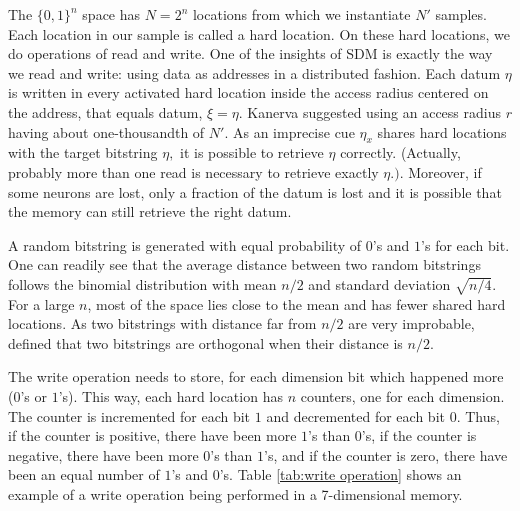 The $\{0,1\}^{n}$ space has $N=2^{n}$ locations from which we instantiate $N'$ samples. Each location in our sample is called a hard location.  On these hard locations, we do operations of read and write. One of the insights of SDM is exactly the way we read and write: using data as addresses in a distributed fashion. Each datum $\eta$ is written in every activated hard location inside the access radius centered on the address, that equals datum, $\xi=\eta$. Kanerva suggested using an access radius $r$ having about one-thousandth of $N'$.  As an imprecise cue $\eta_{x}$ shares hard locations with the target bitstring $\eta,$ it is possible to retrieve $\eta$ correctly. (Actually, probably more than one read is necessary to retrieve exactly $\eta.)$.  Moreover, if some neurons are lost, only a fraction of the datum is lost and it is possible that the memory can still retrieve the right datum.

A random bitstring is generated with equal probability of $0$'s and $1$'s for each bit. One can readily see that the average distance between two random bitstrings follows the binomial distribution with mean $n/2$ and standard deviation $\sqrt{n/4}$. For a large $n$, most of the space lies close to the mean and has fewer shared hard locations.  As two bitstrings with distance far from $n/2$ are very improbable, \citet{Kanerva1988} defined that two bitstrings are orthogonal when their distance is $n/2$.

The write operation needs to store, for each dimension bit which happened more ($0$'s or $1$'s). This way, each hard location has $n$ counters, one for each dimension. The counter is incremented for each bit $1$ and decremented for each bit $0$. Thus, if the counter is positive, there have been more $1$'s than $0$'s, if the counter is negative, there have been more $0$'s than $1$'s, and if the counter is zero, there have been an equal number of $1$'s and $0$'s. Table \ref{tab:write operation} shows an example of a write operation being performed in a 7-dimensional memory.

